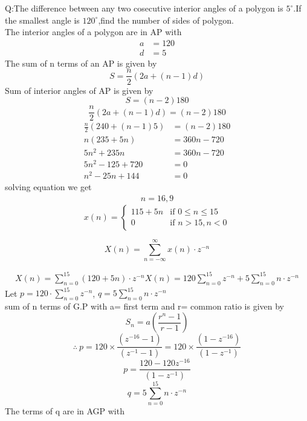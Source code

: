 \documentclass[journal,12pt,onecolumn]{IEEEtran}
\theoremstyle{remark}
\begin{document}
\let\vec\mathbf




\vspace{3cm}



\bigskip

\renewcommand{\thefigure}{\theenumi}
\renewcommand{\thetable}{\theenumi}
Q:The difference between any two cosecutive interior angles of a polygon is $5^\circ$.If the smallest angle is $120^\circ$,find the number of sides of polygon.
\\\solution
The interior angles of a polygon are in AP with
\begin{align*}
    a&=120\\
    d&=5
\end{align*}
The sum of n terms of an AP is given by
\begin{equation}
    S=\frac{n}{2}(2a+(n-1)d)
\end{equation}
Sum of interior angles of AP is given by
\begin{equation}
    S=(n-2)180
\end{equation}
\[\frac{n}{2}(2a+(n-1)d)= (n-2)180 \]
\[
\begin{aligned}
    \frac{n}{2}(240+(n-1)5)&=(n-2)180\\
    n(235+5n)&=360n-720\\
    5n^2+235n&=360n-720\\
    5n^2-125+720&=0\\
    n^2-25n+144&=0
\end{aligned}
\]
solving equation we get
\[
\begin{aligned}
   n=16,9
\end{aligned}
\]
\[ x(n) = \begin{cases}
          115 + 5n & \text{if }0 \leq n\leq 15 \\
          0 & \text{if } n >15 , n<0
       \end{cases} \]

\[
X(n) = \sum_{n=-\infty}^{\infty} x(n) \cdot z^{-n}
\]

\[
\begin{aligned}
   X(n) = \sum_{n=0}^{15} (120+5n) \cdot z^{-n}
   X(n) = 120\sum_{n=0}^{15}z^{-n}+5\sum_{n=0}^{15}n\cdot z^{-n}
\end{aligned}
\]
Let \(p = 120 \cdot \sum_{n=0}^{15} z^{-n}\), \(q = 5\sum_{n=0}^{15}n\cdot z^{-n}\)\\
sum of n terms of G.P with a= first term and r= common ratio is given by
\[ S_n = a \left( \frac{r^n - 1}{r - 1} \right) \]
\[\therefore\ p=120\times \frac{ ( z^{-16}-1)}{(z^{-1}-1)}=120\times \frac{ (1 - z^{-16})}{(1 - z^{-1})} \]
\[p=\frac{120-120 z^{-16}}{(1 - z^{-1})}\]
\[
   q= 5\sum_{n=0}^{15}n\cdot z^{-n}
\]
The terms of q are in AGP with 
\end{document}
